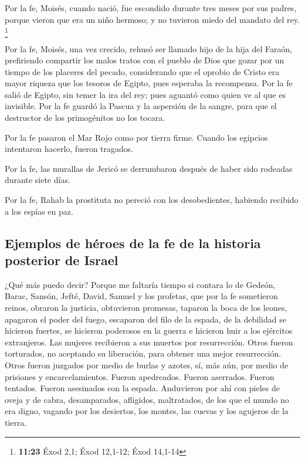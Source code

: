  Por la fe, Moisés, cuando nació, fue escondido durante
tres meses por sus padres, porque vieron que era un niño hermoso; y no
tuvieron miedo del mandato del rey. \footnote{\textbf{11:23} Éxod 2,1;
  Éxod 12,1-12; Éxod 14,1-14}

 Por la fe, Moisés, una vez crecido, rehusó ser llamado
hijo de la hija del Faraón,  prefiriendo compartir los
malos tratos con el pueblo de Dios que gozar por un tiempo de los
placeres del pecado,  considerando que el oprobio de
Cristo era mayor riqueza que los tesoros de Egipto, pues esperaba la
recompensa.  Por la fe salió de Egipto, sin temer la ira
del rey; pues aguantó como quien ve al que es invisible. 
Por la fe guardó la Pascua y la aspersión de la sangre, para que el
destructor de los primogénitos no los tocara.

 Por la fe pasaron el Mar Rojo como por tierra firme.
Cuando los egipcios intentaron hacerlo, fueron tragados.

 Por la fe, las murallas de Jericó se derrumbaron después
de haber sido rodeadas durante siete días.

 Por la fe, Rahab la prostituta no pereció con los
desobedientes, habiendo recibido a los espías en paz.

\hypertarget{ejemplos-de-huxe9roes-de-la-fe-de-la-historia-posterior-de-israel}{%
\subsection{Ejemplos de héroes de la fe de la historia posterior de
Israel}\label{ejemplos-de-huxe9roes-de-la-fe-de-la-historia-posterior-de-israel}}

 ¿Qué más puedo decir? Porque me faltaría tiempo si
contara lo de Gedeón, Barac, Sansón, Jefté, David, Samuel y los
profetas,  que por la fe sometieron reinos, obraron la
justicia, obtuvieron promesas, taparon la boca de los leones,
 apagaron el poder del fuego, escaparon del filo de la
espada, de la debilidad se hicieron fuertes, se hicieron poderosos en la
guerra e hicieron huir a los ejércitos extranjeros.  Las
mujeres recibieron a sus muertos por resurrección. Otros fueron
torturados, no aceptando su liberación, para obtener una mejor
resurrección.  Otros fueron juzgados por medio de burlas
y azotes, sí, más aún, por medio de prisiones y encarcelamientos.
 Fueron apedreados. Fueron aserrados. Fueron tentados.
Fueron asesinados con la espada. Anduvieron por ahí con pieles de oveja
y de cabra, desamparados, afligidos, maltratados,  de los
que el mundo no era digno, vagando por los desiertos, los montes, las
cuevas y los agujeros de la tierra.

